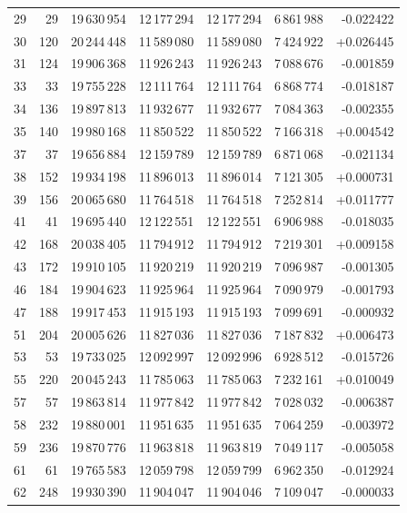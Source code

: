 \begin{longtable}{r r r r r r r}
29 & 29 & 19\,630\,954 & 12\,177\,294 & 12\,177\,294 & 6\,861\,988 & -0.022422\\
30 & 120 & 20\,244\,448 & 11\,589\,080 & 11\,589\,080 & 7\,424\,922 & +0.026445\\
31 & 124 & 19\,906\,368 & 11\,926\,243 & 11\,926\,243 & 7\,088\,676 & -0.001859\\
33 & 33 & 19\,755\,228 & 12\,111\,764 & 12\,111\,764 & 6\,868\,774 & -0.018187\\
34 & 136 & 19\,897\,813 & 11\,932\,677 & 11\,932\,677 & 7\,084\,363 & -0.002355\\
35 & 140 & 19\,980\,168 & 11\,850\,522 & 11\,850\,522 & 7\,166\,318 & +0.004542\\
37 & 37 & 19\,656\,884 & 12\,159\,789 & 12\,159\,789 & 6\,871\,068 & -0.021134\\
38 & 152 & 19\,934\,198 & 11\,896\,013 & 11\,896\,014 & 7\,121\,305 & +0.000731\\
39 & 156 & 20\,065\,680 & 11\,764\,518 & 11\,764\,518 & 7\,252\,814 & +0.011777\\
41 & 41 & 19\,695\,440 & 12\,122\,551 & 12\,122\,551 & 6\,906\,988 & -0.018035\\
42 & 168 & 20\,038\,405 & 11\,794\,912 & 11\,794\,912 & 7\,219\,301 & +0.009158\\
43 & 172 & 19\,910\,105 & 11\,920\,219 & 11\,920\,219 & 7\,096\,987 & -0.001305\\
46 & 184 & 19\,904\,623 & 11\,925\,964 & 11\,925\,964 & 7\,090\,979 & -0.001793\\
47 & 188 & 19\,917\,453 & 11\,915\,193 & 11\,915\,193 & 7\,099\,691 & -0.000932\\
51 & 204 & 20\,005\,626 & 11\,827\,036 & 11\,827\,036 & 7\,187\,832 & +0.006473\\
53 & 53 & 19\,733\,025 & 12\,092\,997 & 12\,092\,996 & 6\,928\,512 & -0.015726\\
55 & 220 & 20\,045\,243 & 11\,785\,063 & 11\,785\,063 & 7\,232\,161 & +0.010049\\
57 & 57 & 19\,863\,814 & 11\,977\,842 & 11\,977\,842 & 7\,028\,032 & -0.006387\\
58 & 232 & 19\,880\,001 & 11\,951\,635 & 11\,951\,635 & 7\,064\,259 & -0.003972\\
59 & 236 & 19\,870\,776 & 11\,963\,818 & 11\,963\,819 & 7\,049\,117 & -0.005058\\
61 & 61 & 19\,765\,583 & 12\,059\,798 & 12\,059\,799 & 6\,962\,350 & -0.012924\\
62 & 248 & 19\,930\,390 & 11\,904\,047 & 11\,904\,046 & 7\,109\,047 & -0.000033\\

\end{longtable}
